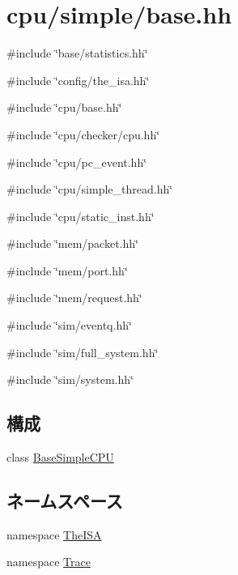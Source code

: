 \hypertarget{cpu_2simple_2base_8hh}{
\section{cpu/simple/base.hh}
\label{cpu_2simple_2base_8hh}
}
{\ttfamily \#include \char`\"{}base/statistics.hh\char`\"{}}\par
{\ttfamily \#include \char`\"{}config/the\_\-isa.hh\char`\"{}}\par
{\ttfamily \#include \char`\"{}cpu/base.hh\char`\"{}}\par
{\ttfamily \#include \char`\"{}cpu/checker/cpu.hh\char`\"{}}\par
{\ttfamily \#include \char`\"{}cpu/pc\_\-event.hh\char`\"{}}\par
{\ttfamily \#include \char`\"{}cpu/simple\_\-thread.hh\char`\"{}}\par
{\ttfamily \#include \char`\"{}cpu/static\_\-inst.hh\char`\"{}}\par
{\ttfamily \#include \char`\"{}mem/packet.hh\char`\"{}}\par
{\ttfamily \#include \char`\"{}mem/port.hh\char`\"{}}\par
{\ttfamily \#include \char`\"{}mem/request.hh\char`\"{}}\par
{\ttfamily \#include \char`\"{}sim/eventq.hh\char`\"{}}\par
{\ttfamily \#include \char`\"{}sim/full\_\-system.hh\char`\"{}}\par
{\ttfamily \#include \char`\"{}sim/system.hh\char`\"{}}\par
\subsection*{構成}
\begin{DoxyCompactItemize}
\item 
class \hyperlink{classBaseSimpleCPU}{BaseSimpleCPU}
\end{DoxyCompactItemize}
\subsection*{ネームスペース}
\begin{DoxyCompactItemize}
\item 
namespace \hyperlink{namespaceTheISA}{TheISA}
\item 
namespace \hyperlink{namespaceTrace}{Trace}
\end{DoxyCompactItemize}
